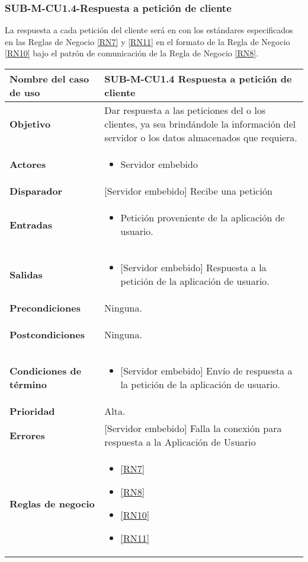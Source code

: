 \subsubsection{SUB-M-CU1.4-Respuesta a petición de cliente}\label{SUB-M-CU1.4}
La respuesta a cada petición del cliente será en con los estándares especificados en las Reglas de Negocio \ref{RN7} y \ref{RN11} en el formato de la Regla de Negocio \ref{RN10} bajo el patrón de comunicación de la Regla de Negocio \ref{RN8}.

\begin{longtable}{|J{5cm}|J{10.3cm}|}
	\hline
	\textbf{Nombre del caso de uso} &
		SUB-M-CU1.4 Respuesta a petición de cliente\\ \hline
	\textbf{Objetivo} &
		Dar respuesta a las peticiones del o los clientes, ya sea brindándole la información del servidor o los datos almacenados que requiera. \\ \hline
	\textbf{Actores} &
		\begin{itemize}
		    \item Servidor embebido
		\end{itemize}\\ \hline 
	\textbf{Disparador} & 
	     {[Servidor embebido]} Recibe una petición\\ \hline 
	\textbf{Entradas} & 
		\begin{itemize}
				\item Petición proveniente de la aplicación de usuario.
		\end{itemize}\\ \hline 
	\textbf{Salidas} & 
		\begin{itemize}
			\item {[Servidor embebido]} Respuesta a la petición de la aplicación de usuario.
		\end{itemize} \\ \hline
	\textbf{Precondiciones} &
		Ninguna.\\ \hline
	\textbf{Postcondiciones} &
		\begin{itemize}
			Ninguna.
		\end{itemize}\\ \hline
	\textbf{Condiciones de término} & 
		\begin{itemize}
			\item {[Servidor embebido]} Envío de respuesta a la petición de la aplicación de usuario.
		\end{itemize} \\ \hline 
	\textbf{Prioridad} & 
		Alta. \\ \hline
	\textbf{Errores} & 
	    \item {[Servidor embebido]} Falla la conexión para respuesta a la Aplicación de Usuario
		\\ \hline
	\textbf{Reglas de negocio} & 
		\begin{itemize}
			\item \ref{RN7}
			\item \ref{RN8}
			\item \ref{RN10}
			\item \ref{RN11}
		\end{itemize} \\ \hline

\end{longtable}
